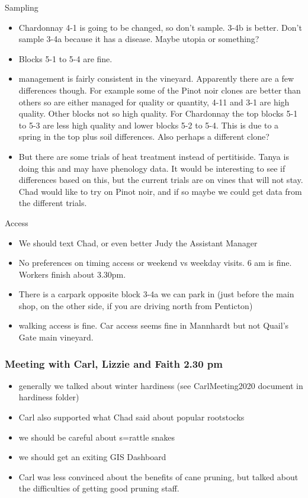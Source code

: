 \documentclass[11pt,letter]{article}
\newenvironment{smitemize}{
\begin{itemize}
  \setlength{\itemsep}{0pt}
  \setlength{\parskip}{0.8pt}
  \setlength{\parsep}{0pt}}
{\end{itemize}
}
\begin{document}
Sampling
\begin{smitemize}
\item Chardonnay 4-1 is going to be changed, so don't sample. 3-4b is better. Don't sample 3-4a because it has a disease. Maybe utopia or something?
\item Blocks 5-1 to 5-4 are fine. 
\item management is fairly consistent in the vineyard. Apparently there are a few differences though. For example some of the Pinot noir clones are better than others so are either managed for quality or quantity, 4-11 and 3-1 are high quality. Other blocks not so high quality. For Chardonnay the top blocks 5-1 to 5-3 are less high quality and lower blocks 5-2 to 5-4. This is due to a spring in the top plus soil differences. Also perhaps a different clone?
\item But there are some trials of heat treatment instead of pertitiside. Tanya is doing this and may have phenology data. It would be interesting to see if differences based on this, but the current trials are on vines that will not stay. Chad would like to try on Pinot noir, and if so maybe we could get data from the different trials. 
 \end{smitemize}  

Access
\begin{smitemize}
\item We should text Chad, or even better Judy the Assistant Manager
\item No preferences on timing access or weekend vs weekday visits. 6 am is fine. Workers finish about 3.30pm.
\item There is a carpark opposite block 3-4a we can park in (just before the main shop, on the other side, if you are driving north from Penticton)
\item walking access is fine. Car access seems fine in Mannhardt but not Quail's Gate main vineyard. 
\end{smitemize}

\subsubsection {Meeting with Carl, Lizzie and Faith 2.30 pm}
\begin{smitemize}
\item generally we talked about winter hardiness (see CarlMeeting2020 document in hardiness folder)
\item Carl also supported what Chad said about popular rootstocks
\item we should be careful about s=rattle snakes 
\item we should get an exiting GIS Dashboard 
\item Carl was less convinced about the benefits of cane pruning, but talked about the difficulties of getting good pruning staff.
\end{smitemize}
\end{document}
